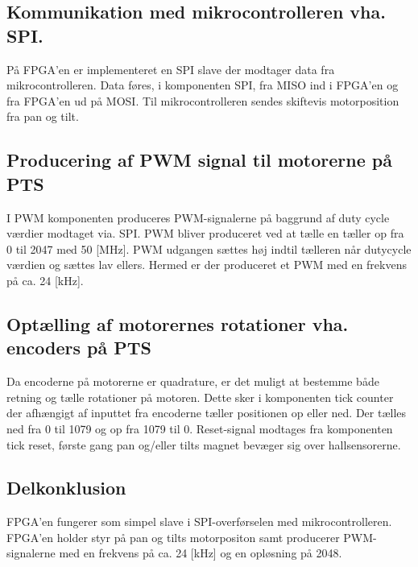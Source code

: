 \subsection[Kommunikation]{Kommunikation med mikrocontrolleren vha. SPI.}
På FPGA'en er implementeret en SPI slave der modtager data fra 
mikrocontrolleren. Data føres, i komponenten SPI, fra MISO ind i FPGA'en og fra FPGA'en ud på 
MOSI. Til mikrocontrolleren sendes skiftevis motorposition fra pan og tilt.

\subsection{Producering af PWM signal til motorerne på PTS}
I PWM komponenten produceres PWM-signalerne på baggrund af duty cycle værdier modtaget via. SPI. 
PWM bliver produceret ved at tælle en tæller op fra 0 til 2047 med 50 [MHz].
PWM udgangen sættes høj indtil tælleren når dutycycle værdien og sættes lav 
ellers. Hermed er der produceret et PWM med en frekvens på ca. 24 [kHz].

\subsection{Optælling af motorernes rotationer vha. encoders på PTS}
Da encoderne på motorerne er quadrature,
er det muligt at bestemme både retning og tælle rotationer på motoren. 
Dette sker i komponenten tick counter der afhængigt af inputtet fra encoderne tæller positionen op eller 
ned.
Der tælles ned fra 0 til 1079 og op fra 1079 til 0.
Reset-signal modtages fra komponenten tick reset, første gang pan og/eller tilts magnet bevæger 
sig over hallsensorerne.

\subsection{Delkonklusion}
FPGA'en fungerer som simpel slave i SPI-overførselen med mikrocontrolleren.
FPGA'en holder styr på pan og tilts motorpositon samt producerer PWM-signalerne 
med en frekvens på ca. 24 [kHz] og en opløsning på 2048.